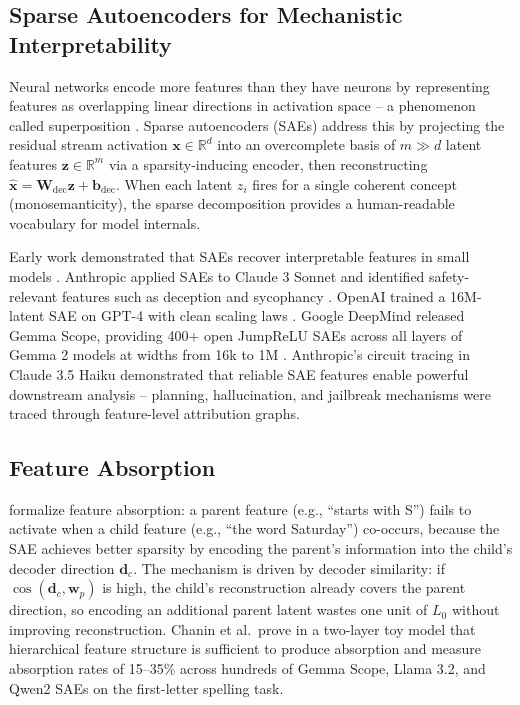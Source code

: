 \documentclass{article}
\begin{document}
\subsection{Sparse Autoencoders for Mechanistic Interpretability}

Neural networks encode more features than they have neurons by representing features as overlapping linear directions in activation space -- a phenomenon called superposition \citep{elhage2022superposition}. Sparse autoencoders (SAEs) address this by projecting the residual stream activation $\mathbf{x} \in \mathbb{R}^d$ into an overcomplete basis of $m \gg d$ latent features $\mathbf{z} \in \mathbb{R}^m$ via a sparsity-inducing encoder, then reconstructing $\hat{\mathbf{x}} = \mathbf{W}_{\text{dec}} \mathbf{z} + \mathbf{b}_{\text{dec}}$. When each latent $z_i$ fires for a single coherent concept (monosemanticity), the sparse decomposition provides a human-readable vocabulary for model internals.

Early work demonstrated that SAEs recover interpretable features in small models \citep{cunningham2024sparse, bricken2023monosemanticity}. Anthropic applied SAEs to Claude 3 Sonnet and identified safety-relevant features such as deception and sycophancy \citep{templeton2024scaling}. OpenAI trained a 16M-latent SAE on GPT-4 with clean scaling laws \citep{gao2024scaling}. Google DeepMind released Gemma Scope, providing 400+ open JumpReLU SAEs across all layers of Gemma 2 models at widths from 16k to 1M \citep{lieberum2024gemma}. Anthropic's circuit tracing in Claude 3.5 Haiku \citep{lindsey2025circuit} demonstrated that reliable SAE features enable powerful downstream analysis -- planning, hallucination, and jailbreak mechanisms were traced through feature-level attribution graphs.

\subsection{Feature Absorption}

\citet{chanin2024absorption} formalize feature absorption: a parent feature (e.g., ``starts with S'') fails to activate when a child feature (e.g., ``the word Saturday'') co-occurs, because the SAE achieves better sparsity by encoding the parent's information into the child's decoder direction $\mathbf{d}_c$. The mechanism is driven by decoder similarity: if $\cos(\mathbf{d}_c, \mathbf{w}_p)$ is high, the child's reconstruction already covers the parent direction, so encoding an additional parent latent wastes one unit of $L_0$ without improving reconstruction. Chanin et al.\ prove in a two-layer toy model that hierarchical feature structure is sufficient to produce absorption and measure absorption rates of 15--35\% across hundreds of Gemma Scope, Llama 3.2, and Qwen2 SAEs on the first-letter spelling task.
\end{document}
